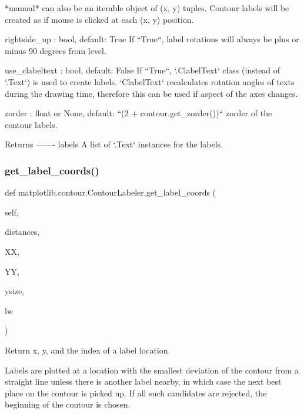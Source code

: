 \begin{DoxyVerb}
    *manual* can also be an iterable object of (x, y) tuples.
    Contour labels will be created as if mouse is clicked at each
    (x, y) position.

rightside_up : bool, default: True
    If ``True``, label rotations will always be plus
    or minus 90 degrees from level.

use_clabeltext : bool, default: False
    If ``True``, `.ClabelText` class (instead of `.Text`) is used to
    create labels. `ClabelText` recalculates rotation angles
    of texts during the drawing time, therefore this can be used if
    aspect of the axes changes.

zorder : float or None, default: ``(2 + contour.get_zorder())``
    zorder of the contour labels.

Returns
-------
labels
    A list of `.Text` instances for the labels.
\end{DoxyVerb}
 \mbox{\label{classmatplotlib_1_1contour_1_1ContourLabeler_a79eb62874fa44f4cfe8a8cf7919d47ed}} 
\subsubsection{\texorpdfstring{get\+\_\+label\+\_\+coords()}{get\_label\_coords()}}
{\footnotesize\ttfamily def matplotlib.\+contour.\+Contour\+Labeler.\+get\+\_\+label\+\_\+coords (\begin{DoxyParamCaption}\item[{}]{self,  }\item[{}]{distances,  }\item[{}]{XX,  }\item[{}]{YY,  }\item[{}]{ysize,  }\item[{}]{lw }\end{DoxyParamCaption})}

\begin{DoxyVerb}Return x, y, and the index of a label location.

Labels are plotted at a location with the smallest
deviation of the contour from a straight line
unless there is another label nearby, in which case
the next best place on the contour is picked up.
If all such candidates are rejected, the beginning
of the contour is chosen.
\end{DoxyVerb}
 \mbox{\label{classmatplotlib_1_1contour_1_1ContourLabeler_ab09cfd2d4503742b0d2c1df282445e05}} 

